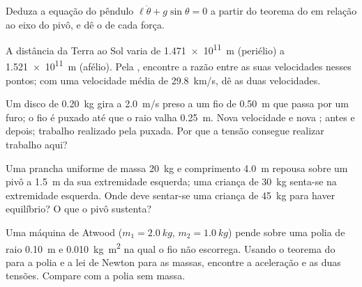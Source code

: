 \begin{exercise}[$\star\star$]\label{exo:b1:angular-momentum:5}
Deduza a equação do pêndulo $\ell\ddot\theta + g\sin\theta = 0$ a partir do
teorema do  em relação ao eixo do pivô, e dê o  de
cada força.
\end{exercise}

\begin{exercise}[$\star\star$]\label{exo:b1:angular-momentum:6}
A distância da Terra ao Sol varia de \qty{1.471e11}{m} (periélio)
a \qty{1.521e11}{m} (afélio). Pela , encontre a razão
entre as suas velocidades nesses pontos; com uma velocidade média de \qty{29.8}{km/s},
dê as duas velocidades.
\end{exercise}

\begin{exercise}[$\star\star$]\label{exo:b1:angular-momentum:7}
Um disco de \qty{0.20}{kg} gira a \qty{2.0}{m/s} preso a um fio de \qty{0.50}{m}
que passa por um furo; o fio é puxado até que o raio valha \qty{0.25}{m}.
Nova velocidade e nova ;  antes e depois; trabalho
realizado pela puxada. Por que a tensão consegue realizar trabalho aqui?
\end{exercise}

\begin{exercise}[$\star\star$]\label{exo:b1:angular-momentum:8}
Uma prancha uniforme de massa \qty{20}{kg} e comprimento \qty{4.0}{m} repousa sobre um
pivô a \qty{1.5}{m} da sua extremidade esquerda; uma criança de \qty{30}{kg} senta-se na
extremidade esquerda. Onde deve sentar-se uma criança de \qty{45}{kg} para haver equilíbrio? O que
o pivô sustenta?
\end{exercise}

\begin{exercise}[$\star\star$]\label{exo:b1:angular-momentum:9}
Uma máquina de Atwood ($m_1 = \qty{2.0}{kg}$, $m_2 = \qty{1.0}{kg}$) pende sobre
uma polia de raio \qty{0.10}{m} e  \qty{0.010}{kg.m^2}
na qual o fio não escorrega. Usando o teorema do 
para a polia e a lei de Newton para as massas, encontre a aceleração
e as duas tensões. Compare com a polia sem massa.
\end{exercise}

